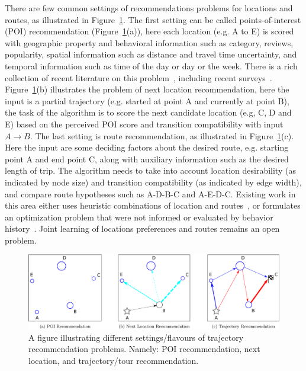 There are few common settings of recommendations problems for locations and routes, as illustrated in Figure~\ref{fig:threesettings}. 
The first setting can be called points-of-interest (POI) recommendation (Figure~\ref{fig:threesettings}(a)), here each location (e.g. A to E) is scored with geographic property and behavioral information such as category, reviews, popularity, spatial information such as distance and travel time uncertainty, and temporal information such as time of the day or day or the week.  There is a rich collection of recent literature on this problem~\cite{bao2015recommendations,yin2015joint,shi2011personalized,lian2014geomf,liu2014exploiting,yuan2013timeaware,hsieh2014mining,gao2013temporal,yuan2014graph}, including recent surveys~\cite{bao2015recommendations,zheng2014urban}. 
Figure~\ref{fig:threesettings}(b) illustrates the problem of next location recommendation\cite{ijcai13,aaai16,baraglia2013learnext,zhang2015location}, here the input is a partial trajectory (e.g. started at point A and currently at point B), the task of the algorithm is to score the next candidate location (e.g, C, D and E) based on the perceived POI score and transition compatibility with input $A\rightarrow B$. 
    The last setting is route recommendation, as illustrated in Figure~\ref{fig:threesettings}(c). Here the input are some deciding factors about the desired route, e.g. starting point A and end point C, along with auxiliary information such as the desired length of trip. The algorithm needs to take into account location desirability (as indicated by node size) and transition compatibility (as indicated by edge width), and compare route hypotheses such as A-D-B-C and A-E-D-C. Existing work in this area either uses heuristic combinations of location and routes~\cite{ijcai15,lu2012personalized}, or formulates an optimization problem that were not informed or evaluated by behavior history~\cite{gioniswsdm14,chen2015tripplanner}. Joint learning of locations preferences and routes remains an open problem.

\begin{figure}[t]
	\centering
	\includegraphics[width=\textwidth]{fig/fig1-flavours.pdf}
	\caption{A figure illustrating different settings/flavours of trajectory recommendation problems. Namely: POI recommendation, next location, and trajectory/tour recommendation.
}
	\label{fig:threesettings}
\end{figure}


